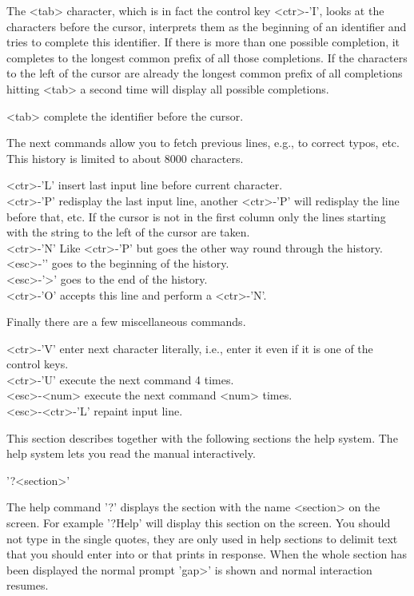The <tab> character, which is in fact the control key <ctr>-'I', looks at
the characters before the cursor, interprets them as the  beginning of an
identifier and  tries to complete this identifier.  If there is more than
one possible completion, it completes to the longest common prefix of all
those completions.   If  the  characters  to the  left  of the cursor are
already  the longest  common  prefix of all completions  hitting <tab>  a
second time will display all possible completions.

<tab>           complete the identifier before the cursor.

The next  commands allow  you to fetch  previous lines, e.g.,  to correct
typos, etc.  This history is limited to about 8000 characters.

<ctr>-'L'       insert last input line before current character.\\
<ctr>-'P'       redisplay  the last input   line, another  <ctr>-'P' will
                redisplay the line  before that, etc.   If  the cursor is
                not in the first column  only the lines starting with the
                string to the left  of the cursor  are taken.\\
<ctr>-'N'       Like <ctr>-'P' but goes the other way round  through  the
                history.\\
<esc>-'\<'      goes to the beginning of the history.\\
<esc>-'>'       goes to the end of the history.\\
<ctr>-'O'       accepts this line and perform a <ctr>-'N'.

Finally there are a few miscellaneous commands.

<ctr>-'V'       enter next character literally, i.e., enter it even if it
                is one of the control keys.\\
<ctr>-'U'       execute the next command 4 times.\\
<esc>-<num>     execute the next command <num> times.\\
<esc>-<ctr>-'L'  repaint input line.

%

This  section describes  together with  the following sections the {\GAP}
help system.  The help system lets you read the manual interactively.

'?<section>'

The help command '?' displays the section  with the name <section> on the
screen.  For  example '?Help'  will display this   section on the screen.
You should not  type in  the single quotes,   they are only  used in help
sections to delimit text that you should enter into {\GAP} or that {\GAP}
prints in response.  When the whole section has been displayed the normal
{\GAP} prompt 'gap>' is shown and normal {\GAP} interaction resumes.

